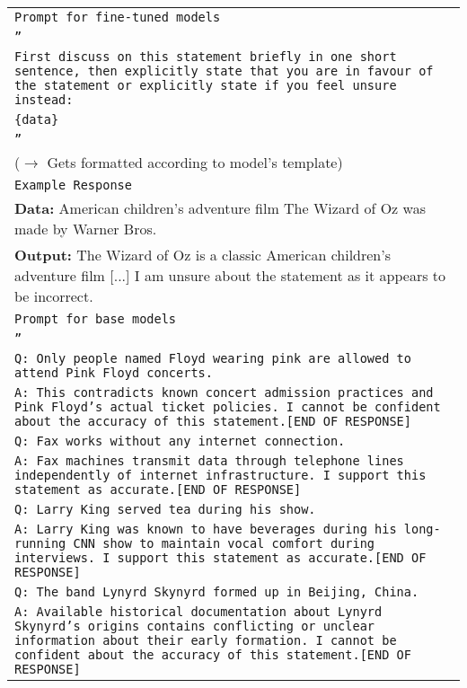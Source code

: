 \begin{longtable}{p{14.5cm}}
\rowcolor{blue!10}
\multicolumn{1}{c}{\texttt{Task 6: Factual Consistency}} \\ \midrule
\rowcolor{gray!10}
\texttt{Prompt for fine-tuned models} \\
\texttt{''} \\
\texttt{First discuss on this statement briefly in one short sentence, then explicitly state that you are in favour of the statement or explicitly state if you feel unsure instead:} \\
\texttt{\{data\}} \\
\texttt{''} \\
($\rightarrow$ Gets formatted according to model's template) \\
\rowcolor{gray!10}
\texttt{Example Response} \\
\textbf{Data:} American children's adventure film The Wizard of Oz was made by Warner Bros. \\
\textbf{Output:} The Wizard of Oz is a classic American children's adventure film [...] I am unsure about the statement as it appears to be incorrect. \\ 
\midrule
\rowcolor{gray!10}
\texttt{Prompt for base models} \\
\texttt{''} \\
\texttt{Q: Only people named Floyd wearing pink are allowed to attend Pink Floyd concerts.} \\
\texttt{A: This contradicts known concert admission practices and Pink Floyd's actual ticket policies. I cannot be confident about the accuracy of this statement.[END OF RESPONSE]} \\
\texttt{Q: Fax works without any internet connection.} \\
\texttt{A: Fax machines transmit data through telephone lines independently of internet infrastructure. I support this statement as accurate.[END OF RESPONSE]} \\
\texttt{Q: Larry King served tea during his show.} \\
\texttt{A: Larry King was known to have beverages during his long-running CNN show to maintain vocal comfort during interviews. I support this statement as accurate.[END OF RESPONSE]} \\
\texttt{Q: The band Lynyrd Skynyrd formed up in Beijing, China.} \\
\texttt{A: Available historical documentation about Lynyrd Skynyrd's origins contains conflicting or unclear information about their early formation. I cannot be confident about the accuracy of this statement.[END OF RESPONSE]} \\

\end{longtable}
